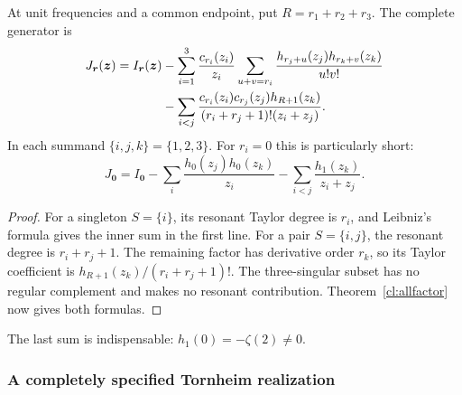 \begin{corollary}
\label{cl:triple-completion}
At unit frequencies and a common endpoint, put $R=r_1+r_2+r_3$.
The complete generator is
\begin{align}
 J_{\boldsymbol r}(\boldsymbol z)=I_{\boldsymbol r}(\boldsymbol z)
 &-\sum_{i=1}^3\frac{c_{r_i}(z_i)}{z_i}
     \sum_{u+v=r_i}\frac{h_{r_j+u}(z_j)h_{r_k+v}(z_k)}{u!v!}\notag\\
 &-\sum_{i<j}\frac{c_{r_i}(z_i)c_{r_j}(z_j)h_{R+1}(z_k)}
          {(r_i+r_j+1)!(z_i+z_j)}.\label{cl:triple-generator}
\end{align}
In each summand $\{i,j,k\}=\{1,2,3\}$.
For $r_i=0$ this is particularly short:
\begin{equation}\label{cl:triple-zero}
 J_{\boldsymbol0}=I_{\boldsymbol0}
 -\sum_i\frac{h_0(z_j)h_0(z_k)}{z_i}
 -\sum_{i<j}\frac{h_1(z_k)}{z_i+z_j}.
\end{equation}
\end{corollary}
\begin{proof}
For a singleton $S=\{i\}$, its resonant Taylor degree is $r_i$,
and Leibniz's formula gives the inner sum in the first line.
For a pair $S=\{i,j\}$, the resonant degree is $r_i+r_j+1$.
The remaining factor has derivative order $r_k$, so its Taylor
coefficient is $h_{R+1}(z_k)/(r_i+r_j+1)!$. The three-singular
subset has no regular complement and makes no resonant contribution.
Theorem~\ref{cl:allfactor} now gives both formulas.
\end{proof}
The last sum is indispensable: $h_1(0)=-\zeta(2)\ne0$.

\subsubsection{A completely specified Tornheim realization}
\label{cl:tornheim}

